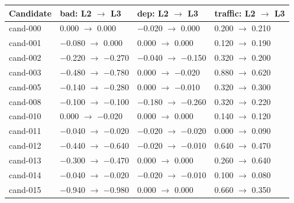 \begin{tabular}{llll}
\toprule
Candidate & bad: L2 $\rightarrow$ L3 & dep: L2 $\rightarrow$ L3 & traffic: L2 $\rightarrow$ L3 \\
\midrule
cand-000 & 0.000 $\rightarrow$ 0.000 & $-$0.020 $\rightarrow$ 0.000 & 0.200 $\rightarrow$ 0.210 \\
cand-001 & $-$0.080 $\rightarrow$ 0.000 & 0.000 $\rightarrow$ 0.000 & 0.120 $\rightarrow$ 0.190 \\
cand-002 & $-$0.220 $\rightarrow$ $-$0.270 & $-$0.040 $\rightarrow$ $-$0.150 & 0.320 $\rightarrow$ 0.200 \\
cand-003 & $-$0.480 $\rightarrow$ $-$0.780 & 0.000 $\rightarrow$ $-$0.020 & 0.880 $\rightarrow$ 0.620 \\
cand-005 & $-$0.140 $\rightarrow$ $-$0.280 & 0.000 $\rightarrow$ $-$0.010 & 0.320 $\rightarrow$ 0.300 \\
cand-008 & $-$0.100 $\rightarrow$ $-$0.100 & $-$0.180 $\rightarrow$ $-$0.260 & 0.320 $\rightarrow$ 0.220 \\
cand-010 & 0.000 $\rightarrow$ $-$0.020 & 0.000 $\rightarrow$ 0.000 & 0.140 $\rightarrow$ 0.120 \\
cand-011 & $-$0.040 $\rightarrow$ $-$0.020 & $-$0.020 $\rightarrow$ $-$0.020 & 0.000 $\rightarrow$ 0.090 \\
cand-012 & $-$0.440 $\rightarrow$ $-$0.640 & $-$0.020 $\rightarrow$ $-$0.010 & 0.640 $\rightarrow$ 0.470 \\
cand-013 & $-$0.300 $\rightarrow$ $-$0.470 & 0.000 $\rightarrow$ 0.000 & 0.260 $\rightarrow$ 0.640 \\
cand-014 & $-$0.040 $\rightarrow$ $-$0.020 & $-$0.020 $\rightarrow$ $-$0.010 & 0.100 $\rightarrow$ 0.080 \\
cand-015 & $-$0.940 $\rightarrow$ $-$0.980 & 0.000 $\rightarrow$ 0.000 & 0.660 $\rightarrow$ 0.350 \\
\bottomrule
\end{tabular}
